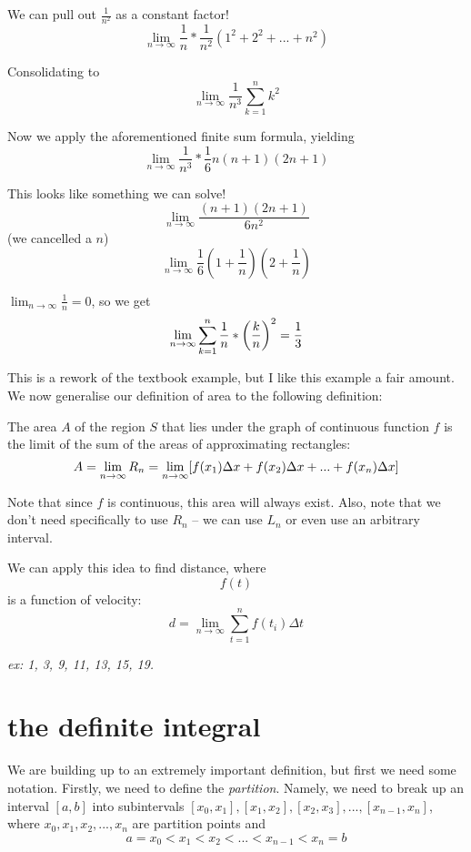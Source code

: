 \documentclass[10pt,a4paper]{report}
\begin{document}
We can pull out $\frac{1}{n^2}$ as a constant factor!
$$
	\lim_{n \to \infty} \frac{1}{n} * \frac{1}{n^2} (1^2 + 2^2 + ... + n^2)
$$

Consolidating to
$$
	\lim_{n \to \infty} \frac{1}{n^3} \displaystyle\sum_{k = 1}^{n} k^2
$$

Now we apply the aforementioned finite sum formula, yielding
$$
	\lim_{n \to \infty} \frac{1}{n^3} * \frac{1}{6} n(n+1)(2n+1)
$$

This looks like something we can solve!
$$
	\lim_{n \to \infty} \frac{(n+1)(2n+1)}{6n^2}
$$
(we cancelled a $n$)
$$
	\lim_{n \to \infty} \frac{1}{6} \left( 1 + \frac{1}{n} \right) \left( 2 + \frac{1}{n} \right)
$$

$\lim_{n \to \infty} \frac{1}{n} = 0$, so we get
$$
	\lim_{n \to \infty} \displaystyle\sum_{k = 1}^{n} \frac{1}{n} * \left(\frac{k}{n} \right)^2 = \\
	\frac{1}{3}
$$

This is a rework of the textbook example, but I like this example a fair amount. We now generalise our definition of area to the following definition:

The area $A$ of the region $S$ that lies under the graph of continuous function $f$ is the limit of the sum of the areas of approximating rectangles:
$$
	A = \lim_{n \to \infty} R_n = \lim_{n \to \infty} [f(x_1) \Delta x + f(x_2) \Delta x + ... + \\
	f(x_n) \Delta x ]
$$

Note that since $f$ is continuous, this area will always exist. Also, note that we don't need specifically to use $R_n$ -- we can use $L_n$ or even use an arbitrary interval.

We can apply this idea to find distance, where $$f(t)$$ is a function of velocity:
$$
	d = \lim_{n \to \infty} \displaystyle\sum_{t = 1}^{n} f(t_i) \Delta t
$$

\emph{ex: 1, 3, 9, 11, 13, 15, 19.}

\section{the definite integral}

We are building up to an extremely important definition, but first we need some notation. Firstly, we need to define the \emph{partition}. Namely, we need to break up an interval $[a, b]$ into subintervals $[x_0, x_1],  [x_1, x_2], [x_2, x_3], ..., [x_{n-1}, x_n]$, where $x_0, x_1, x_2, ..., x_n$ are partition points and 
$$a = x_0 < x_1 < x_2 < ... < x_{n - 1} < x_n = b$$
\end{document}
